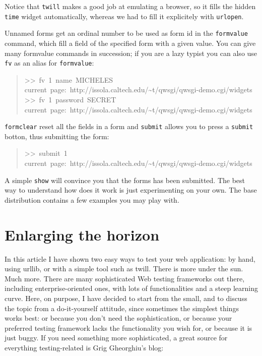 \documentclass[10pt,a4paper,english]{article}
\begin{document}
Notice that \texttt{twill} makes a good job at emulating a browser, so it fills
the hidden \texttt{time} widget automatically, whereas
we had to fill it explicitely with \texttt{urlopen}.

Unnamed forms get an ordinal number to be used as form id
in the \texttt{formvalue} command, which fill a field
of the specified form with a given value. You can give many
formvalue commands in succession; if you are a lazy typist
you can also use \texttt{fv} as an alias for \texttt{formvalue}:
\begin{quote}{\ttfamily \raggedright \noindent
>{}>~fv~1~name~MICHELES~\\
current~page:~http://issola.caltech.edu/{\textasciitilde}t/qwsgi/qwsgi-demo.cgi/widgets~\\
>{}>~fv~1~password~SECRET~\\
current~page:~http://issola.caltech.edu/{\textasciitilde}t/qwsgi/qwsgi-demo.cgi/widgets
}\end{quote}

\texttt{formclear} reset all the fields in a form and \texttt{submit} allows
you to press a \texttt{submit} botton, thus submitting the form:
\begin{quote}{\ttfamily \raggedright \noindent
>{}>~submit~1~\\
current~page:~http://issola.caltech.edu/{\textasciitilde}t/qwsgi/qwsgi-demo.cgi/widgets
}\end{quote}

A simple \texttt{show} will convince you that the forms has been submitted.
The best way to understand how does it work is just experimenting
on your own. The base distribution contains a few examples you may
play with.



\hypertarget{enlarging-the-horizon}{}
\section*{Enlarging the horizon}

In this article I have shown two easy ways to test your web 
application: by hand, using urllib, or with a simple tool such as twill. 
There is more under the sun. Much more. There are many sophisticated 
Web testing frameworks out there, including enterprise-oriented ones,
with lots of functionalities and a steep learning curve. Here, on purpose,
I have decided to start from the small, and to discuss the topic from a 
do-it-yourself attitude, since sometimes the simplest things works best: or
because you don't need the sophistication, or because your preferred
testing framework lacks the functionality you wish for, or because
it is just buggy. If you need something more sophisticated, a great source for 
everything testing-related is Grig Gheorghiu's blog:
\end{document}
